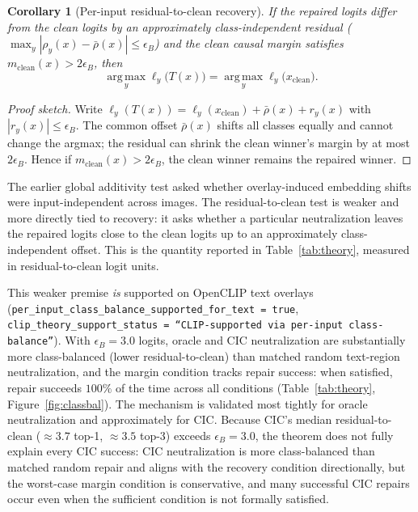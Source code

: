\documentclass[11pt]{article}
\newtheorem{corollary}{Corollary}
\newcommand{\argmax}{\operatorname*{arg\,max}}
\begin{document}
\begin{corollary}[Per-input residual-to-clean recovery]
If the repaired logits differ from the clean logits by an approximately
class-independent residual ($\max_y|\rho_y(x)-\bar\rho(x)|\le\epsilon_B$) and the
clean causal margin satisfies $m_{\mathrm{clean}}(x)>2\epsilon_B$, then
\begin{equation}
\argmax_y \ell_y\big(T(x)\big) = \argmax_y \ell_y\big(x_{\mathrm{clean}}\big).
\end{equation}
\end{corollary}
\begin{proof}[Proof sketch]
Write $\ell_y(T(x))=\ell_y(x_{\mathrm{clean}})+\bar\rho(x)+r_y(x)$ with
$|r_y(x)|\le\epsilon_B$. The common offset $\bar\rho(x)$ shifts all classes equally
and cannot change the argmax; the residual can shrink the clean winner's margin by at
most $2\epsilon_B$. Hence if $m_{\mathrm{clean}}(x)>2\epsilon_B$, the clean winner
remains the repaired winner.
\end{proof}

The earlier global additivity test asked whether overlay-induced embedding shifts
were input-independent across images. The residual-to-clean test is weaker and more
directly tied to recovery: it asks whether a particular neutralization leaves the
repaired logits close to the clean logits up to an approximately class-independent
offset. This is the quantity reported in Table~\ref{tab:theory}, measured in
residual-to-clean logit units.

This weaker premise \emph{is} supported on OpenCLIP text overlays
(\texttt{per\_input\_class\_balance\_supported\_for\_text = true},
\texttt{clip\_theory\_support\_status = ``CLIP-supported via per-input
class-balance''}). With $\epsilon_B=3.0$ logits, oracle and CIC neutralization are
substantially more class-balanced (lower residual-to-clean) than matched random
text-region neutralization, and the margin condition tracks repair success: when
satisfied, repair succeeds $100\%$ of the time across all conditions
(Table~\ref{tab:theory}, Figure~\ref{fig:classbal}). The mechanism is validated most
tightly for oracle neutralization and approximately for CIC. Because CIC's median
residual-to-clean ($\approx 3.7$ top-1, $\approx 3.5$ top-3) exceeds
$\epsilon_B=3.0$, the theorem does not fully explain every CIC success: CIC
neutralization is more class-balanced than matched random repair and aligns with the
recovery condition directionally, but the worst-case margin condition is
conservative, and many successful CIC repairs occur even when the sufficient
condition is not formally satisfied.
\end{document}
